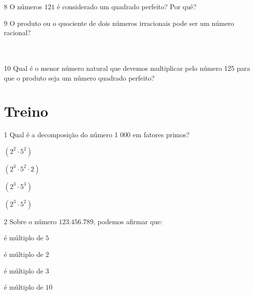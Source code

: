 \num{8} O números $121$ é considerado um quadrado perfeito? Por quê?

\num{9} O produto ou o quociente de dois números irracionais pode ser um
número racional?

\\
\\


\num{10} Qual é o menor número natural que devemos multiplicar pelo número
125 para que o produto seja um número quadrado perfeito?
\\

\section{Treino}

\num{1} Qual é a decomposição do número 1 000 em fatores primos?

\begin{escolha}
\item $(2^2\cdot 5^2)$
\item $(2^3 \cdot 5^2 \cdot 2)$
\item $(2^3 \cdot 5^3)$
\item $(2^3 \cdot 5^2)$
\end{escolha}









\num{2} Sobre o número $123.456.789$, podemos afirmar que:

\begin{escolha}
\item é múltiplo de $5$
\item é múltiplo de $2$
\item é múltiplo de $3$
\item é múltiplo de $10$
\end{escolha}


